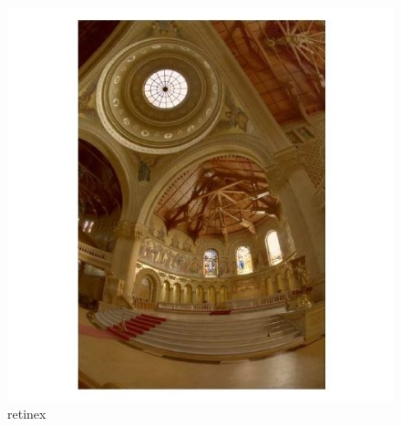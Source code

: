 {        
    \begin{figure}[!htb]
        	\includegraphics[width=\linewidth]{images/retinex3}
        	\caption{retinex}\label{fig:logtonemap}
      \endminipage\hfill
    \end{figure}
        
}
